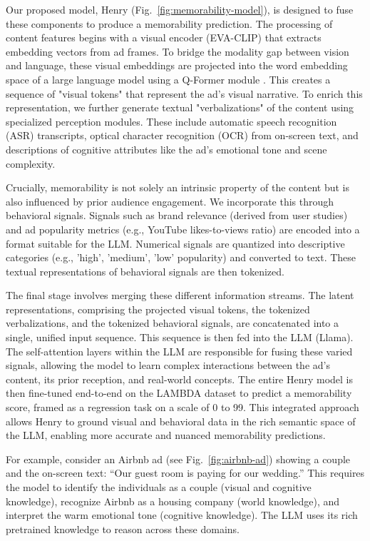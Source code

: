 Our proposed model, Henry (Fig.~\ref{fig:memorability-model}), is designed to fuse these components to produce a memorability prediction. The processing of content features begins with a visual encoder (EVA-CLIP) that extracts embedding vectors from ad frames. To bridge the modality gap between vision and language, these visual embeddings are projected into the word embedding space of a large language model using a Q-Former module \cite{li2023blip}. This creates a sequence of "visual tokens" that represent the ad's visual narrative. To enrich this representation, we further generate textual "verbalizations" of the content using specialized perception modules. These include automatic speech recognition (ASR) transcripts, optical character recognition (OCR) from on-screen text, and descriptions of cognitive attributes like the ad's emotional tone and scene complexity.

Crucially, memorability is not solely an intrinsic property of the content but is also influenced by prior audience engagement. We incorporate this through behavioral signals. Signals such as brand relevance (derived from user studies) and ad popularity metrics (e.g., YouTube likes-to-views ratio) are encoded into a format suitable for the LLM. Numerical signals are quantized into descriptive categories (e.g., 'high', 'medium', 'low' popularity) and converted to text. These textual representations of behavioral signals are then tokenized.

The final stage involves merging these different information streams. The latent representations, comprising the projected visual tokens, the tokenized verbalizations, and the tokenized behavioral signals, are concatenated into a single, unified input sequence. This sequence is then fed into the LLM (Llama). The self-attention layers within the LLM are responsible for fusing these varied signals, allowing the model to learn complex interactions between the ad's content, its prior reception, and real-world concepts. The entire Henry model is then fine-tuned end-to-end on the LAMBDA dataset to predict a memorability score, framed as a regression task on a scale of 0 to 99. This integrated approach allows Henry to ground visual and behavioral data in the rich semantic space of the LLM, enabling more accurate and nuanced memorability predictions.


For example, consider an Airbnb ad (see Fig.~\ref{fig:airbnb-ad}) showing a couple and the on-screen text: “Our guest room is paying for our wedding.” This requires the model to identify the individuals as a couple (visual and cognitive knowledge), recognize Airbnb as a housing company (world knowledge), and interpret the warm emotional tone (cognitive knowledge). The LLM uses its rich pretrained knowledge to reason across these domains.

